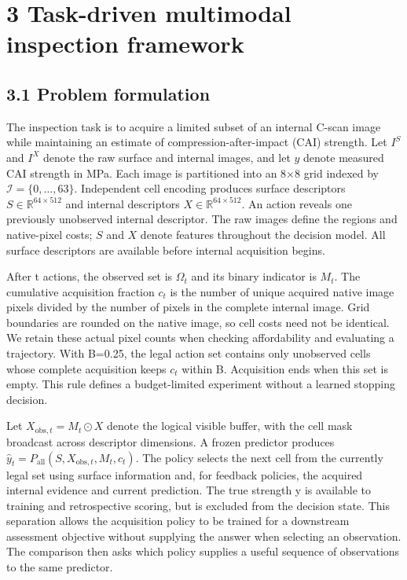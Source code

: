 \section{3 Task-driven multimodal inspection framework}\label{task-driven-multimodal-inspection-framework}

\subsection{3.1 Problem formulation}\label{problem-formulation}

The inspection task is to acquire a limited subset of an internal C-scan image while maintaining an estimate of compression-after-impact (CAI) strength. Let \(I^S\) and \(I^X\) denote the raw surface and internal images, and let \(y\) denote measured CAI strength in MPa. Each image is partitioned into an 8×8 grid indexed by \(\mathcal{I}=\{0,\ldots,63\}\). Independent cell encoding produces surface descriptors \(S\in\mathbb{R}^{64\times512}\) and internal descriptors \(X\in\mathbb{R}^{64\times512}\). An action reveals one previously unobserved internal descriptor. The raw images define the regions and native-pixel costs; \(S\) and \(X\) denote features throughout the decision model. All surface descriptors are available before internal acquisition begins.

After t actions, the observed set is \(\Omega_t\) and its binary indicator is \(M_t\). The cumulative acquisition fraction \(c_t\) is the number of unique acquired native image pixels divided by the number of pixels in the complete internal image. Grid boundaries are rounded on the native image, so cell costs need not be identical. We retain these actual pixel counts when checking affordability and evaluating a trajectory. With B=0.25, the legal action set contains only unobserved cells whose complete acquisition keeps \(c_t\) within B. Acquisition ends when this set is empty. This rule defines a budget-limited experiment without a learned stopping decision.

Let \(X_{\mathrm{obs},t}=M_t\odot X\) denote the logical visible buffer, with the cell mask broadcast across descriptor dimensions. A frozen predictor produces \(\hat{y}_t=P_{\mathrm{all}}(S,X_{\mathrm{obs},t},M_t,c_t)\). The policy selects the next cell from the currently legal set using surface information and, for feedback policies, the acquired internal evidence and current prediction. The true strength y is available to training and retrospective scoring, but is excluded from the decision state. This separation allows the acquisition policy to be trained for a downstream assessment objective without supplying the answer when selecting an observation. The comparison then asks which policy supplies a useful sequence of observations to the same predictor.

